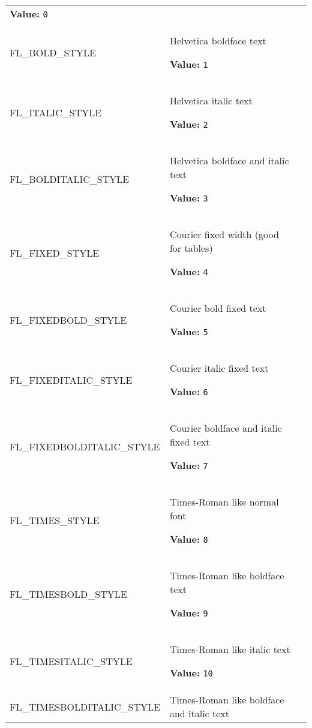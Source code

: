 \begin{longtable}{|p{\varnamewidth}|p{\vardescrwidth}|l}
\textbf{Value:} 
{\tt 0}&\\
\cline{1-2}
\raggedright F\-L\-\_\-B\-O\-L\-D\-\_\-S\-T\-Y\-L\-E\- & \raggedright Helvetica boldface text

\textbf{Value:} 
{\tt 1}&\\
\cline{1-2}
\raggedright F\-L\-\_\-I\-T\-A\-L\-I\-C\-\_\-S\-T\-Y\-L\-E\- & \raggedright Helvetica italic text

\textbf{Value:} 
{\tt 2}&\\
\cline{1-2}
\raggedright F\-L\-\_\-B\-O\-L\-D\-I\-T\-A\-L\-I\-C\-\_\-S\-T\-Y\-L\-E\- & \raggedright Helvetica boldface and italic text

\textbf{Value:} 
{\tt 3}&\\
\cline{1-2}
\raggedright F\-L\-\_\-F\-I\-X\-E\-D\-\_\-S\-T\-Y\-L\-E\- & \raggedright Courier fixed width (good for tables)

\textbf{Value:} 
{\tt 4}&\\
\cline{1-2}
\raggedright F\-L\-\_\-F\-I\-X\-E\-D\-B\-O\-L\-D\-\_\-S\-T\-Y\-L\-E\- & \raggedright Courier bold fixed text

\textbf{Value:} 
{\tt 5}&\\
\cline{1-2}
\raggedright F\-L\-\_\-F\-I\-X\-E\-D\-I\-T\-A\-L\-I\-C\-\_\-S\-T\-Y\-L\-E\- & \raggedright Courier italic fixed text

\textbf{Value:} 
{\tt 6}&\\
\cline{1-2}
\raggedright F\-L\-\_\-F\-I\-X\-E\-D\-B\-O\-L\-D\-I\-T\-A\-L\-I\-C\-\_\-S\-T\-Y\-L\-E\- & \raggedright Courier boldface and italic fixed text

\textbf{Value:} 
{\tt 7}&\\
\cline{1-2}
\raggedright F\-L\-\_\-T\-I\-M\-E\-S\-\_\-S\-T\-Y\-L\-E\- & \raggedright Times-Roman like normal font

\textbf{Value:} 
{\tt 8}&\\
\cline{1-2}
\raggedright F\-L\-\_\-T\-I\-M\-E\-S\-B\-O\-L\-D\-\_\-S\-T\-Y\-L\-E\- & \raggedright Times-Roman like boldface text

\textbf{Value:} 
{\tt 9}&\\
\cline{1-2}
\raggedright F\-L\-\_\-T\-I\-M\-E\-S\-I\-T\-A\-L\-I\-C\-\_\-S\-T\-Y\-L\-E\- & \raggedright Times-Roman like italic text

\textbf{Value:} 
{\tt 10}&\\
\cline{1-2}
\raggedright F\-L\-\_\-T\-I\-M\-E\-S\-B\-O\-L\-D\-I\-T\-A\-L\-I\-C\-\_\-S\-T\-Y\-L\-E\- & \raggedright Times-Roman like boldface and italic text


\end{longtable}
